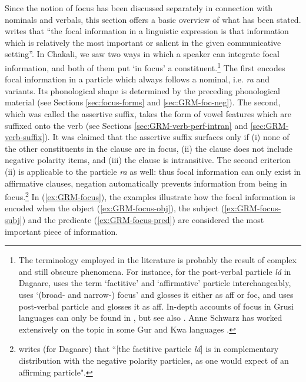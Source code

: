 \begin{exe}
\begin{exe}
\begin{exe}
{\begin{exe}
\begin{exe}
\begin{exe}
\begin{exe}
\begin{exe}
\begin{exe}
\begin{exe}
\begin{xlist}
\begin{exe}
\begin{exe}
\begin{exe}
\begin{exe}
\begin{exe}
\begin{exe}
\begin{exe}
\begin{exe}
\begin{exe}
\begin{exe}
\begin{exe}
\begin{exe}
\begin{exe}
\begin{exe}
\begin{exe}
Since the notion of focus has been discussed separately in connection with
nominals and verbals, this section offers a basic overview of what has been
stated.  \citet[326]{Dik97} writes that   ``the focal information in a
linguistic expression is
that
information which is relatively the most important or salient in the given
communicative setting''.  In Chakali, we saw  two ways in which a
speaker can integrate focal information, and both of them put `in focus' a
constituent.\footnote{The  terminology employed in the literature is probably
the result
of  complex and still obscure phenomena. For instance, for the
post-verbal particle {\it lá} in Dagaare, \citet{Bodo97} uses the term
`factitive' and `affirmative' particle interchangeably, \citet{Daku05} uses
`(broad- and narrow-)  focus' and glosses it either as {\sc aff} or {\sc foc},
and
\citet{Saan03} uses post-verbal particle and glosses it as {\sc aff}. In-depth
accounts of focus in Grusi languages can only be found in \citet{blas90}, 
but see also \citet{Mcgi99}.
 Anne Schwarz has worked extensively on the topic in some Gur and Kwa
languages \citep{Schw10}.}   The first
encodes focal information in a particle which  always
 follows a nominal, i.e. {\it ra} and variants. Its  phonological shape is
determined by the
preceding phonological material (see Sections \ref{sec:focus-forms} and 
\ref{sec:GRM-foc-neg}). The second, which was called the assertive suffix, takes
the form of vowel features which
are suffixed onto the verb  (see Sections \ref{sec:GRM-verb-perf-intran} and 
\ref{sec:GRM-verb-suffix}). It was claimed that  the assertive suffix surfaces
only if (i) none of the other constituents in the
clause are in focus, (ii) the clause does not include negative polarity items,
and (iii) the clause is intransitive.
The second criterion (ii) is applicable to the particle {\it ra} as well: thus
focal
information can only exist in affirmative clauses, negation automatically
prevents information from being in focus.\footnote{\citet[94]{Bodo97} writes
(for
Dagaare) that
``[the factitive particle {\it lá}] is in complementary distribution with the
negative polarity particles, as one would expect of an affirming particle".}  In
 (\ref{ex:GRM-focus}),  the
examples illustrate  how the  focal information is
encoded when the object (\ref{ex:GRM-focus-obj}), the subject
(\ref{ex:GRM-focus-subj}) and the predicate  (\ref{ex:GRM-focus-pred}) are
considered the most important piece of information. 


\ea\label{ex:GRM-focus}


\end{exe}
\end{exe}
\end{exe}
\end{exe}
\end{exe}
\end{exe}
\end{exe}
\end{exe}
\end{exe}
\end{exe}
\end{exe}
\end{exe}
\end{exe}
\end{exe}
\end{exe}
\end{xlist}
\end{exe}
\end{exe}
\end{exe}
\end{exe}
\end{exe}
\end{exe}
\end{exe}}
\end{exe}
\end{exe}
\end{exe}
